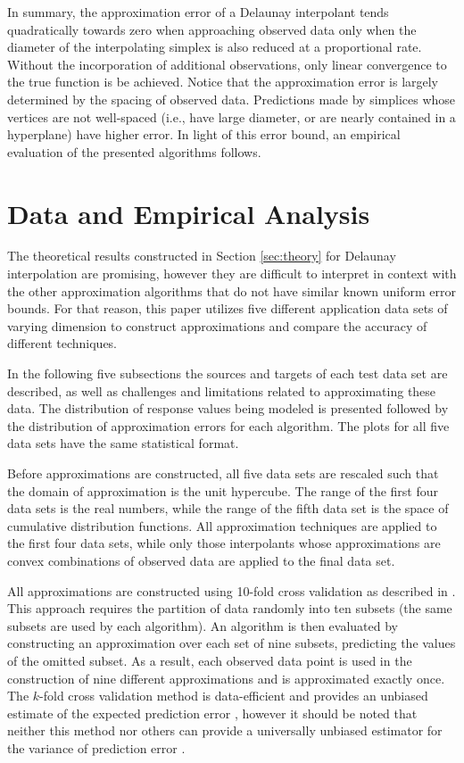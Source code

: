 \documentclass[smallextended,final]{svjour3}       %
\begin{document}
In summary, the approximation error of a Delaunay interpolant tends
quadratically towards zero when approaching observed data only when the
diameter of the interpolating simplex is also reduced at a proportional
rate. Without the incorporation of additional observations, only linear
convergence to the true function is be achieved. Notice that the
approximation error is largely determined by the spacing of observed data.
Predictions made by simplices whose vertices are not well-spaced (i.e.,
have large diameter, or are nearly contained in a hyperplane) have higher
error. In light of this error bound, an empirical evaluation of the
presented algorithms follows.

\section{Data and Empirical Analysis}
\label{sec:data}

The theoretical results constructed in Section \ref{sec:theory} for Delaunay
interpolation are promising, however they are difficult to interpret in
context with the other approximation algorithms that do not have similar
known uniform error bounds. For that reason, this paper utilizes five
different application data sets of varying dimension to construct
approximations and compare the accuracy of different techniques.

In the following five subsections the sources and targets of each test
data set are described, as well as challenges and limitations related to
approximating these data. The distribution of response values being modeled
is presented followed by the distribution of approximation errors for each
algorithm. The plots for all five data sets have the same statistical format.

Before approximations are constructed, all five data sets are rescaled
such that the domain of approximation is the unit hypercube. The range of
the first four data sets is the real numbers, while the range of the fifth
data set is the space of cumulative distribution functions. All approximation
techniques are applied to the first four data sets, while only those
interpolants whose approximations are convex combinations of observed data
are applied to the final data set.

All approximations are constructed using 10-fold cross validation as
described in \cite{kohavi1995study}. This approach requires the partition
of data randomly into ten subsets (the same subsets are used by
each algorithm). An algorithm is then evaluated by constructing an
approximation over each set of nine subsets, predicting the values of
the omitted subset. As a result, each observed data point is used in the
construction of nine different approximations and is approximated exactly
once. The $k$-fold cross validation method is data-efficient and provides
an unbiased estimate of the expected prediction error \cite{kohavi1995study},
however it should be noted that neither this method nor others can provide
a universally unbiased estimator for the variance of prediction error
\cite{bengio2004no}.
\end{document}
